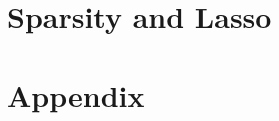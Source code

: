\documentclass{article}
\begin{document}


\section{Sparsity and Lasso}

\section{Appendix}
\end{document}

